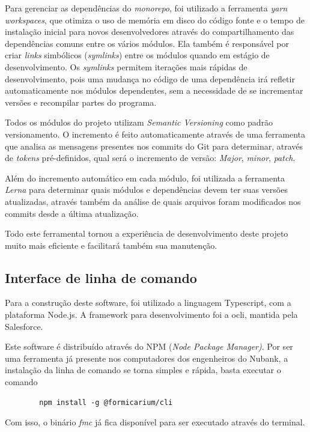         Para gerenciar as dependências do \textit{monorepo}, foi utilizado a ferramenta \textit{yarn workspaces}, que otimiza o uso de memória em disco do código fonte e o tempo de instalação inicial para novos desenvolvedores através do compartilhamento das dependências comuns entre os vários módulos. Ela também é responsável por criar \textit{links} simbólicos (\textit{symlinks}) entre os módulos quando em estágio de desenvolvimento. Os \textit{symlinks} permitem iterações mais rápidas de desenvolvimento, pois uma mudança no código de uma dependência irá refletir automaticamente nos módulos dependentes, sem a necessidade de se incrementar versões e recompilar partes do programa.

        Todos os módulos do projeto utilizam \textit{Semantic Versioning} como padrão versionamento. O incremento é feito automaticamente através de uma ferramenta que analisa as mensagens presentes nos commits do Git para determinar, através de \textit{tokens} pré-definidos, qual será o incremento de versão: \textit{Major}, \textit{minor}, \textit{patch}.

        Além do incremento automático em cada módulo, foi utilizada a ferramenta \textit{Lerna} para determinar quais módulos e dependências devem ter suas versões atualizadas, através também da análise de quais arquivos foram modificados nos commits desde a última atualização.

        Todo este ferramental tornou a experiência de desenvolvimento deste projeto muito mais eficiente e facilitará também sua manutenção.

    \subsection{Interface de linha de comando}
        
        Para a construção deste software, foi utilizado a linguagem Typescript, com a plataforma Node.js. A framework para desenvolvimento foi a ocli, mantida pela Salesforce.
        
        Este software é distribuído através do NPM (\textit{Node Package Manager)}. Por ser uma ferramenta já presente nos computadores dos engenheiros do Nubank, a instalação da linha de comando se torna simples e rápida, basta executar o comando
    \begin{verbatim}
	    npm install -g @formicarium/cli
	\end{verbatim}
	
	Com isso, o binário \textit{fmc} já fica disponível para ser executado através do terminal.
	
